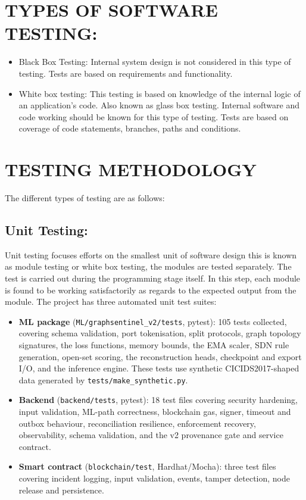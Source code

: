 \documentclass[12pt,a4paper]{report}
\begin{document}
\section {TYPES OF SOFTWARE TESTING:}
\begin{itemize}
    \item Black Box Testing: Internal system design is not considered in this type of testing. Tests are based on requirements and functionality.
\item White box testing: This testing is based on knowledge of the internal logic of an application's code. Also known as glass box testing. Internal software and code working should be known for this type of testing. Tests are based on coverage of code statements, branches, paths and conditions.
\end{itemize}



\section{TESTING METHODOLOGY}
	The different types of testing are as follows:
\subsection{ Unit Testing:}

Unit testing focuses efforts on the smallest unit of software design this is known as module testing or white box testing, the modules are tested separately. The test is carried out during the programming stage itself. In this step, each module is found to be working satisfactorily as regards to the expected output from the module. The project has three automated unit test suites:
\begin{itemize}
    \item \textbf{ML package} (\texttt{ML/graphsentinel\_v2/tests}, pytest): 105 tests collected, covering schema validation, port tokenisation, split protocols, graph topology signatures, the loss functions, memory bounds, the EMA scaler, SDN rule generation, open-set scoring, the reconstruction heads, checkpoint and export I/O, and the inference engine. These tests use synthetic CICIDS2017-shaped data generated by \texttt{tests/make\_synthetic.py}.
    \item \textbf{Backend} (\texttt{backend/tests}, pytest): 18 test files covering security hardening, input validation, ML-path correctness, blockchain gas, signer, timeout and outbox behaviour, reconciliation resilience, enforcement recovery, observability, schema validation, and the v2 provenance gate and service contract.
    \item \textbf{Smart contract} (\texttt{blockchain/test}, Hardhat/Mocha): three test files covering incident logging, input validation, events, tamper detection, node release and persistence.
\end{itemize}
\end{document}
